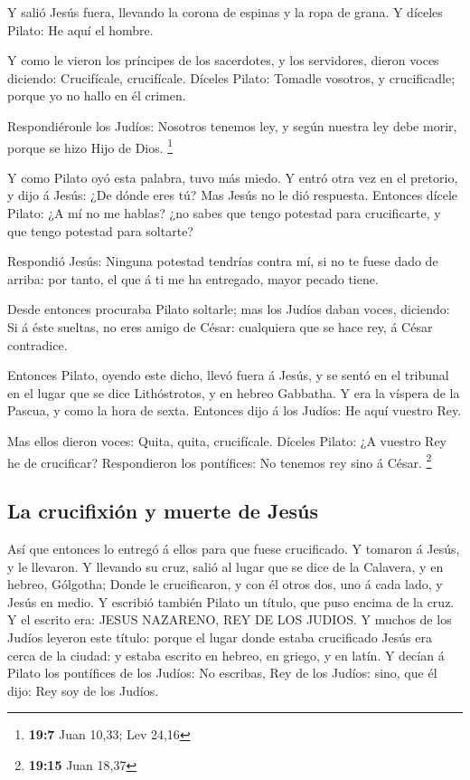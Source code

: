  Y salió Jesús fuera, llevando la corona de espinas y la
ropa de grana. Y díceles Pilato: He aquí el hombre.

 Y como le vieron los príncipes de los sacerdotes, y los
servidores, dieron voces diciendo: Crucifícale, crucifícale. Díceles
Pilato: Tomadle vosotros, y crucificadle; porque yo no hallo en él
crimen.

 Respondiéronle los Judíos: Nosotros tenemos ley, y según
nuestra ley debe morir, porque se hizo Hijo de Dios. \footnote{\textbf{19:7}
  Juan 10,33; Lev 24,16}

 Y como Pilato oyó esta palabra, tuvo más miedo.
 Y entró otra vez en el pretorio, y dijo á Jesús: ¿De dónde
eres tú? Mas Jesús no le dió respuesta.  Entonces dícele
Pilato: ¿A mí no me hablas? ¿no sabes que tengo potestad para
crucificarte, y que tengo potestad para soltarte?

 Respondió Jesús: Ninguna potestad tendrías contra mí, si
no te fuese dado de arriba: por tanto, el que á ti me ha entregado,
mayor pecado tiene.

 Desde entonces procuraba Pilato soltarle; mas los Judíos
daban voces, diciendo: Si á éste sueltas, no eres amigo de César:
cualquiera que se hace rey, á César contradice.

 Entonces Pilato, oyendo este dicho, llevó fuera á Jesús, y
se sentó en el tribunal en el lugar que se dice Lithóstrotos, y en
hebreo Gabbatha.  Y era la víspera de la Pascua, y como la
hora de sexta. Entonces dijo á los Judíos: He aquí vuestro Rey.

 Mas ellos dieron voces: Quita, quita, crucifícale. Díceles
Pilato: ¿A vuestro Rey he de crucificar? Respondieron los pontífices: No
tenemos rey sino á César. \footnote{\textbf{19:15} Juan 18,37}

\hypertarget{la-crucifixiuxf3n-y-muerte-de-jesuxfas}{%
\subsection{La crucifixión y muerte de
Jesús}\label{la-crucifixiuxf3n-y-muerte-de-jesuxfas}}

 Así que entonces lo entregó á ellos para que fuese
crucificado. Y tomaron á Jesús, y le llevaron.  Y llevando
su cruz, salió al lugar que se dice de la Calavera, y en hebreo,
Gólgotha;  Donde le crucificaron, y con él otros dos, uno á
cada lado, y Jesús en medio.  Y escribió también Pilato un
título, que puso encima de la cruz. Y el escrito era: JESUS NAZARENO,
REY DE LOS JUDIOS.  Y muchos de los Judíos leyeron este
título: porque el lugar donde estaba crucificado Jesús era cerca de la
ciudad: y estaba escrito en hebreo, en griego, y en latín. 
Y decían á Pilato los pontífices de los Judíos: No escribas, Rey de los
Judíos: sino, que él dijo: Rey soy de los Judíos.


